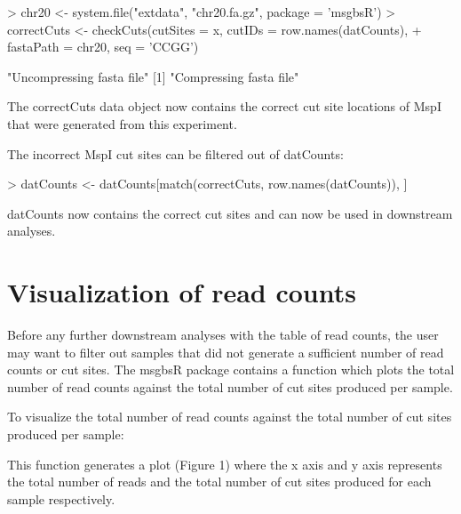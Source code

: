 \documentclass{article}
\begin{document}
\begin{Schunk}
\begin{Sinput}
> chr20 <- system.file("extdata", "chr20.fa.gz", package = 'msgbsR')
> correctCuts <- checkCuts(cutSites = x, cutIDs = row.names(datCounts),
+                          fastaPath = chr20, seq = 'CCGG')
\end{Sinput}
\begin{Soutput}
[1] "Uncompressing fasta file"
[1] "Compressing fasta file"
\end{Soutput}
\end{Schunk}

The correctCuts data object now contains the correct cut site locations of MspI that were generated from this experiment.

The incorrect MspI cut sites can be filtered out of datCounts:
\begin{Schunk}
\begin{Sinput}
> datCounts <- datCounts[match(correctCuts, row.names(datCounts)), ]
\end{Sinput}
\end{Schunk}

datCounts now contains the correct cut sites and can now be used in downstream analyses.

\section{Visualization of read counts}

Before any further downstream analyses with the table of read counts, the user may want to filter out samples that did not generate a sufficient number of read counts or cut sites. The msgbsR package contains a function which plots the total number of read counts against the total number of cut sites produced per sample.

To visualize the total number of read counts against the total number of cut sites produced per sample:
\begin{Schunk}
\end{Schunk}

This function generates a plot (Figure 1) where the x axis and y axis represents the total number of reads and the total number of cut sites produced for each sample respectively.
\end{document}
